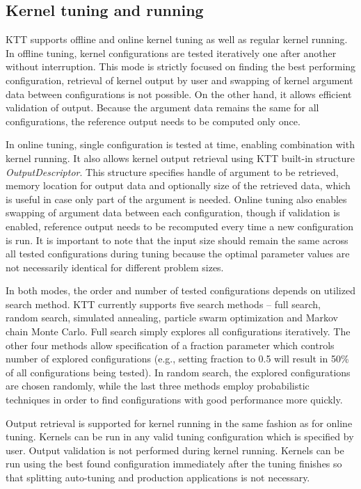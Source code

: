 \documentclass
[
    digital, %
    oneside, %
    table, %
    nolof, %
    nolot, %
    nocover %
]{fithesis3}
\begin{document}
\subsection{Kernel tuning and running}
KTT supports offline and online kernel tuning as well as regular kernel running. In offline tuning, kernel configurations are tested iteratively one
after another without interruption. This mode is strictly focused on finding the best performing configuration, retrieval of kernel output by user and
swapping of kernel argument data between configurations is not possible. On the other hand, it allows efficient validation of output. Because the
argument data remains the same for all configurations, the reference output needs to be computed only once.

In online tuning, single configuration is tested at time, enabling combination with kernel running. It also allows kernel output retrieval using
KTT built-in structure \textit{OutputDescriptor}. This structure specifies handle of argument to be retrieved, memory location for output data and
optionally size of the retrieved data, which is useful in case only part of the argument is needed. Online tuning also enables swapping of argument
data between each configuration, though if validation is enabled, reference output needs to be recomputed every time a new configuration is run.
It is important to note that the input size should remain the same across all tested configurations during tuning because the optimal parameter values
are not necessarily identical for different problem sizes.

In both modes, the order and number of tested configurations depends on utilized search method. KTT currently supports five search methods -- full
search, random search, simulated annealing, particle swarm optimization and Markov chain Monte Carlo. Full search simply explores all configurations
iteratively. The other four methods allow specification of a fraction parameter which controls number of explored configurations (e.g., setting fraction
to 0.5 will result in 50\% of all configurations being tested). In random search, the explored configurations are chosen randomly, while the last three
methods employ probabilistic techniques in order to find configurations with good performance more quickly.

Output retrieval is supported for kernel running in the same fashion as for online tuning. Kernels can be run in any valid tuning configuration which is
specified by user. Output validation is not performed during kernel running. Kernels can be run using the best found configuration immediately after the
tuning finishes so that splitting auto-tuning and production applications is not necessary.
\end{document}
